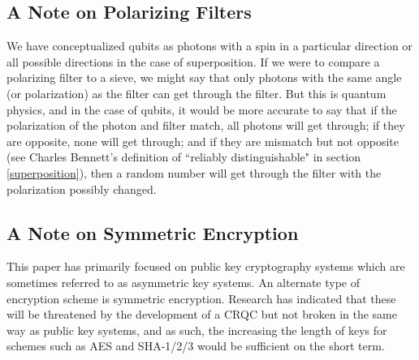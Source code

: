     \pagebreak
    
    \subsection{A Note on Polarizing Filters} \label{note:polarize}
    We have conceptualized qubits as photons with a spin in a particular direction or all possible directions in the case of superposition. If we were to compare a polarizing filter to a sieve, we might say that only photons with the same angle (or polarization) as the filter can get through the filter. But this is quantum physics, and in the case of qubits, it would be more accurate to say that if the polarization of the photon and filter match, all photons will get through; if they are opposite, none will get through; and if they are mismatch but not opposite (see Charles Bennett's definition of ``reliably distinguishable" in section \ref{superposition}), then a random number will get through the filter with the polarization possibly changed.

    \subsection{A Note on Symmetric Encryption}
    This paper has primarily focused on public key cryptography systems which are sometimes referred to as asymmetric key systems. An alternate type of encryption scheme is symmetric encryption. Research has indicated that these will be threatened by the development of a CRQC but not broken in the same way as public key systems, and as such, the increasing the length of keys for schemes such as AES and SHA-1/2/3 would be sufficient on the short term.